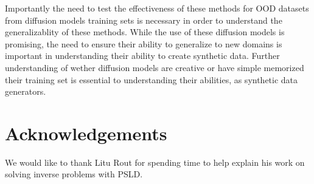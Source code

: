 \documentclass{article}
\begin{document}
Importantly the need to test the effectiveness of these methods for OOD datasets from diffusion models training sets is necessary in order to understand the generalizablity 
of these methods. While the use of these diffusion models is promising, the need to ensure their ability to generalize to new domains is important in understanding their ability
to create synthetic data. Further understanding of wether diffusion models are creative or have simple memorized their training set is essential to understanding their abilities,
as synthetic data generators.

\section*{Acknowledgements}

We would like to thank Litu Rout for spending time to help explain his work on solving inverse problems with PSLD.



\end{document}
